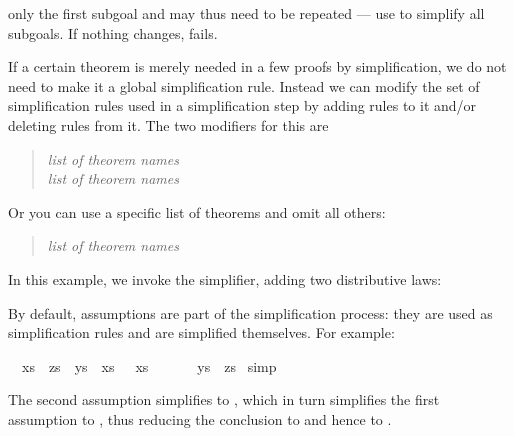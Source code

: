\begin{isabellebody}
\begin{isamarkuptext}
only the first subgoal and may thus need to be repeated --- use
 to simplify all subgoals.
If nothing changes,  fails.%
\end{isamarkuptext}%
\isamarkuptrue%
%
\isamarkuptrue%
%
\begin{isamarkuptext}%
%
If a certain theorem is merely needed in a few proofs by simplification,
we do not need to make it a global simplification rule. Instead we can modify
the set of simplification rules used in a simplification step by adding rules
to it and/or deleting rules from it. The two modifiers for this are
\begin{quote}
 \textit{list of theorem names}\\
 \textit{list of theorem names}
\end{quote}
Or you can use a specific list of theorems and omit all others:
\begin{quote}
 \textit{list of theorem names}
\end{quote}
In this example, we invoke the simplifier, adding two distributive
laws:
\begin{quote}
\end{quote}%
\end{isamarkuptext}%
\isamarkuptrue%
%
\isamarkuptrue%
%
\begin{isamarkuptext}%
By default, assumptions are part of the simplification process: they are used
as simplification rules and are simplified themselves. For example:%
\end{isamarkuptext}%
\isamarkuptrue%
\isamarkupfalse%
\ {\isachardoublequoteopen}{\isasymlbrakk}\ xs\ {\isacharat}\ zs\ {\isacharequal}\ ys\ {\isacharat}\ xs{\isacharsemicolon}\ {\isacharbrackleft}{\isacharbrackright}\ {\isacharat}\ xs\ {\isacharequal}\ {\isacharbrackleft}{\isacharbrackright}\ {\isacharat}\ {\isacharbrackleft}{\isacharbrackright}\ {\isasymrbrakk}\ {\isasymLongrightarrow}\ ys\ {\isacharequal}\ zs{\isachardoublequoteclose}\isanewline
%
\isadelimproof
%
\endisadelimproof
%
\isatagproof
{}\isamarkupfalse%
\ simp\isanewline
{}\isamarkupfalse%
%
\endisatagproof
{\isafoldproof}%
%
\isadelimproof
%
\endisadelimproof
%
\begin{isamarkuptext}%
\noindent
The second assumption simplifies to , which in turn
simplifies the first assumption to , thus reducing the
conclusion to  and hence to .


\end{isamarkuptext}
\end{isabellebody}

